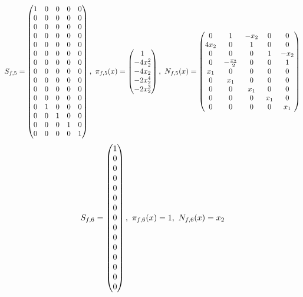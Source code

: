 \documentclass[fleqn]{article}
\begin{document}
\begin{align}
    S_{f,5} = \pmqty{ 1 & 0 & 0 & 0 & 0 \\ 0 & 0 & 0 & 0 & 0 \\ 0 & 0 & 0 & 0 & 0 \\ 0 & 0 & 0 & 0 & 0 \\ 0 & 0 & 0 & 0 & 0 \\ 0 & 0 & 0 & 0 & 0 \\ 0 & 0 & 0 & 0 & 0 \\ 0 & 0 & 0 & 0 & 0 \\ 0 & 0 & 0 & 0 & 0 \\ 0 & 0 & 0 & 0 & 0 \\ 0 & 0 & 0 & 0 & 0 \\ 0 & 1 & 0 & 0 & 0 \\ 0 & 0 & 1 & 0 & 0 \\ 0 & 0 & 0 & 1 & 0 \\ 0 & 0 & 0 & 0 & 1 }
    ,~
    \pi_{f,5}(x) = \pmqty{
        1         \\
        -4x_{2}^2 \\
        -4x_{2}   \\
        -2x_{2}^4 \\
        -2x_{2}^3 \\
    }
    ,~
    N_{f,5}(x) = \pmqty{
        0      & 1                & -x_{2} & 0     & 0      \\
        4x_{2} & 0                & 1      & 0     & 0      \\
        0      & 0                & 0      & 1     & -x_{2} \\
        0      & -\frac{x_{2}}{2} & 0      & 0     & 1      \\
        x_{1}  & 0                & 0      & 0     & 0      \\
        0      & x_{1}            & 0      & 0     & 0      \\
        0      & 0                & x_{1}  & 0     & 0      \\
        0      & 0                & 0      & x_{1} & 0      \\
        0      & 0                & 0      & 0     & x_{1}  \\
    }
\end{align}
\begin{align}
    S_{f,6} = \pmqty{ 1 \\ 0 \\ 0 \\ 0 \\ 0 \\ 0 \\ 0 \\ 0 \\ 0 \\ 0 \\ 0 \\ 0 \\ 0 \\ 0 \\ 0 }
    ,~
    \pi_{f,6}(x) = 1
    ,~
    N_{f,6}(x) = x_{2}
\end{align}
\end{document}
